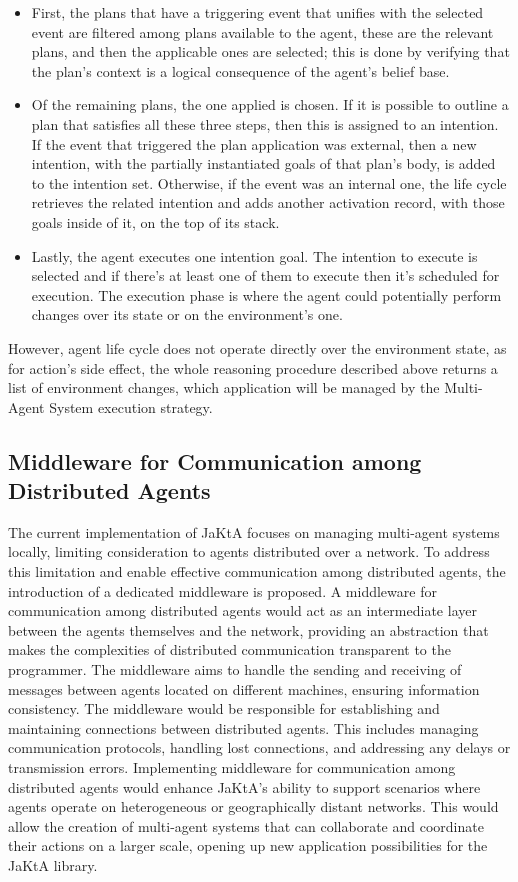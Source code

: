 \begin{itemize}
    \item First, the plans that have a triggering event that unifies with the selected event are filtered among plans available to the agent, these are the relevant plans, and then the applicable ones are selected; this is done by verifying that the plan's context is a logical consequence of the agent's belief base.
    \item Of the remaining plans, the one applied is chosen. If it is possible to outline a plan that satisfies all these three steps, then this is assigned to an intention. If the event that triggered the plan application was external, then a new intention, with the partially instantiated goals of that plan's body, is added to the intention set. Otherwise, if the event was an internal one, the life cycle retrieves the related intention and adds another activation record, with those goals inside of it, on the top of its stack.
    \item Lastly, the agent executes one intention goal. The intention to execute is selected and if there's at least one of them to execute then it's scheduled for execution. The execution phase is where the agent could potentially perform changes over its state or on the environment's one.
\end{itemize}

However, agent life cycle does not operate directly over the environment state, as for action's side effect, the whole reasoning procedure described above returns a list of environment changes, which application will be managed by the Multi-Agent System execution strategy.

\subsection{Middleware for Communication among Distributed Agents}

The current implementation of JaKtA focuses on managing multi-agent systems locally, limiting consideration to agents distributed over a network. To address this limitation and enable effective communication among distributed agents, the introduction of a dedicated middleware is proposed.
A middleware for communication among distributed agents would act as an intermediate layer between the agents themselves and the network, providing an abstraction that makes the complexities of distributed communication transparent to the programmer. The middleware aims to handle the sending and receiving of messages between agents located on different machines, ensuring information consistency.
The middleware would be responsible for establishing and maintaining connections between distributed agents. This includes managing communication protocols, handling lost connections, and addressing any delays or transmission errors.
Implementing middleware for communication among distributed agents would enhance JaKtA's ability to support scenarios where agents operate on heterogeneous or geographically distant networks. This would allow the creation of multi-agent systems that can collaborate and coordinate their actions on a larger scale, opening up new application possibilities for the JaKtA library.
